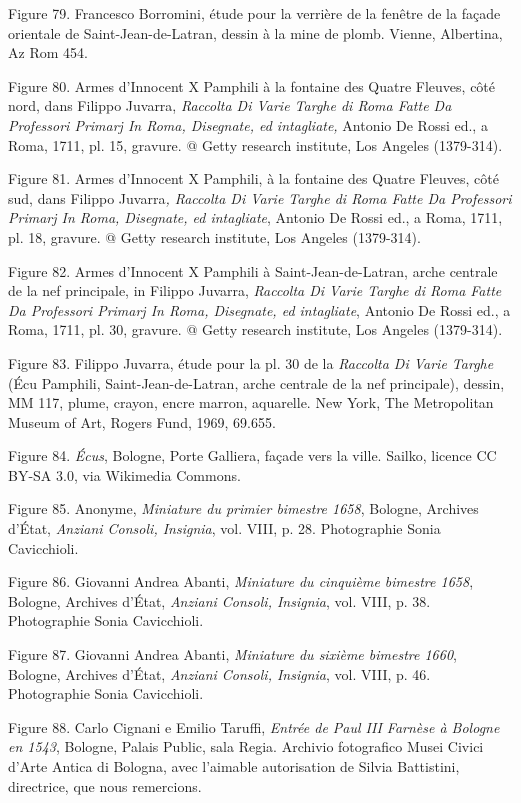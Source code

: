 \documentclass[12pt,twoside,openany]{book}
\begin{document}
Figure 79. Francesco Borromini, étude pour la verrière de la fenêtre de la façade orientale de Saint-Jean-de-Latran, dessin à la mine de plomb. Vienne, Albertina, Az Rom 454.

Figure 80. Armes d’Innocent X Pamphili à la fontaine des Quatre Fleuves, côté nord, dans Filippo Juvarra, \textit{Raccolta Di Varie Targhe di Roma Fatte Da Professori Primarj In Roma, Disegnate, ed intagliate,} Antonio De Rossi ed., a Roma, 1711, pl. 15, gravure. @ Getty research institute, Los Angeles (1379-314).

Figure 81. Armes d’Innocent X Pamphili, à la fontaine des Quatre Fleuves, côté sud, dans Filippo Juvarra\textit{, Raccolta Di Varie Targhe di Roma Fatte Da Professori Primarj In Roma, Disegnate, ed intagliate}, Antonio De Rossi ed., a Roma, 1711, pl. 18, gravure. @ Getty research institute, Los Angeles (1379-314).

Figure 82. Armes d’Innocent X Pamphili à Saint-Jean-de-Latran, arche centrale de la nef principale, in Filippo Juvarra, \textit{Raccolta Di Varie Targhe di Roma Fatte Da Professori Primarj In Roma, Disegnate, ed intagliate}, Antonio De Rossi ed., a Roma, 1711, pl. 30, gravure. @ Getty research institute, Los Angeles (1379-314).

Figure 83. Filippo Juvarra, étude pour la pl. 30 de la \textit{Raccolta Di Varie Targhe }(Écu Pamphili, Saint-Jean-de-Latran, arche centrale de la nef principale), dessin, MM 117, plume, crayon, encre marron, aquarelle. New York, The Metropolitan Museum of Art, Rogers Fund, 1969, 69.655.

Figure 84. \textit{Écus}, Bologne, Porte Galliera, façade vers la ville. Sailko, licence CC BY-SA 3.0, via Wikimedia Commons.

Figure 85. Anonyme, \textit{Miniature du primier bimestre 1658}, Bologne, Archives d’État, \textit{Anziani Consoli, Insignia}, vol. VIII, p. 28. Photographie Sonia Cavicchioli.

Figure 86. Giovanni Andrea Abanti, \textit{Miniature du cinquième bimestre 1658}, Bologne, Archives d’État, \textit{Anziani Consoli, Insignia}, vol. VIII, p. 38. Photographie Sonia Cavicchioli.

Figure 87. Giovanni Andrea Abanti, \textit{Miniature du sixième bimestre 1660}, Bologne, Archives d’État, \textit{Anziani Consoli, Insignia}, vol. VIII, p. 46. Photographie Sonia Cavicchioli.

Figure 88. Carlo Cignani e Emilio Taruffi, \textit{Entrée de Paul III Farnèse à Bologne en 1543}, Bologne, Palais Public, sala Regia. Archivio fotografico Musei Civici d’Arte Antica di Bologna, avec l'aimable autorisation de Silvia Battistini, directrice, que nous remercions.
\end{document}

